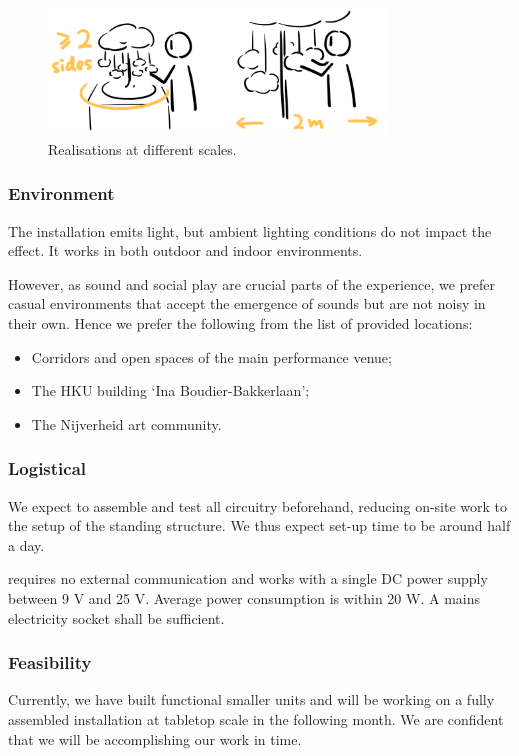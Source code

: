 \documentclass{nimemusic}
\begin{document}
\begin{figure}[h!]
  \includegraphics[width=0.8\textwidth]{Dimensions.png}
  \caption{Realisations at different scales.}
  \label{fig:Dimensions}
\end{figure}

\subsubsection{Environment}
The installation emits light, but ambient lighting conditions do not impact the effect. It works in both outdoor and indoor environments.

However, as sound and social play are crucial parts of the experience, we prefer casual environments that accept the emergence of sounds but are not noisy in their own. Hence we prefer the following from the list of provided locations:
\begin{itemize}
  \item Corridors and open spaces of the main performance venue;
  \item The HKU building `Ina Boudier-Bakkerlaan';
  \item The Nijverheid art community.
\end{itemize}

\subsubsection{Logistical}
We expect to assemble and test all circuitry beforehand, reducing on-site work to the setup of the standing structure. We thus expect set-up time to be around half a day.

\CuHum{} requires no external communication and works with a single DC power supply between 9 V and 25 V. Average power consumption is within 20 W. A mains electricity socket shall be sufficient.

\subsubsection{Feasibility}
Currently, we have built functional smaller units and will be working on a fully assembled installation at tabletop scale in the following month. We are confident that we will be accomplishing our work in time.
\end{document}
